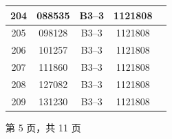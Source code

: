 \documentclass[UTF8,10pt,a4paper,fontset=fandol]{ctexart}
\newcommand{\fieldvalue}[1]{#1}
\begin{document}
\begin{tabularx}{\textwidth}{|c|c|c|c|X|}
\fieldvalue{204} &
\fieldvalue{088535} &
\fieldvalue{B3--3} &
\fieldvalue{1121808} & \\ \hline
\fieldvalue{205} &
\fieldvalue{098128} &
\fieldvalue{B3--3} &
\fieldvalue{1121808} & \\ \hline
\fieldvalue{206} &
\fieldvalue{101257} &
\fieldvalue{B3--3} &
\fieldvalue{1121808} & \\ \hline
\fieldvalue{207} &
\fieldvalue{111860} &
\fieldvalue{B3--3} &
\fieldvalue{1121808} & \\ \hline
\fieldvalue{208} &
\fieldvalue{127082} &
\fieldvalue{B3--3} &
\fieldvalue{1121808} & \\ \hline
\fieldvalue{209} &
\fieldvalue{131230} &
\fieldvalue{B3--3} &
\fieldvalue{1121808} & \\ \hline
\end{tabularx}

\begin{center}
第 5 页，共 11 页
\end{center}

\newpage
\end{document}
